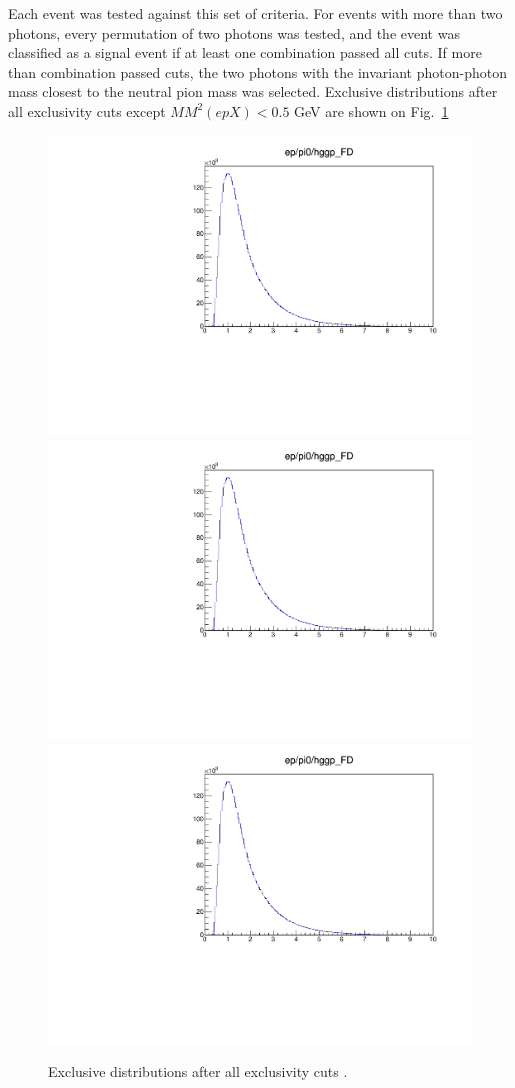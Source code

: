     Each event was tested against this set of criteria. For events with more than two photons, every permutation of two photons was tested, and the event was classified as a signal event if at least one combination passed all cuts. If more than combination passed cuts, the two photons with the invariant photon-photon mass closest to the neutral pion mass was selected. Exclusive distributions after all exclusivity cuts except $MM^2(epX)<0.5$ GeV are shown on Fig.~\ref{fig:finalexclusive}
    
    \begin{figure}[hbt]
    	\centering
    	
    	\includegraphics[page=82,width=0.32\linewidth]{Chapters/Ch4-BaseAnalysis/1_Event_Selection_Cuts/figures/eppi0.exclusive.pdf}
    	\includegraphics[page=83,width=0.32\linewidth]{Chapters/Ch4-BaseAnalysis/1_Event_Selection_Cuts/figures/eppi0.exclusive.pdf}
    	\includegraphics[page=84,width=0.32\linewidth]{Chapters/Ch4-BaseAnalysis/1_Event_Selection_Cuts/figures/eppi0.exclusive.pdf}
    	\caption{Exclusive distributions after all exclusivity cuts .}
    	\label{fig:finalexclusive}
    \end{figure}











\iffalse



